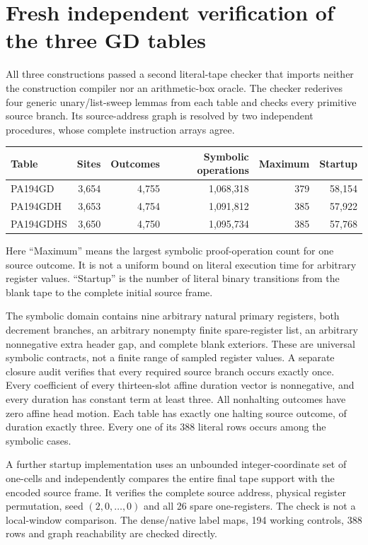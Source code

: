 \section{Fresh independent verification of the three GD tables}

All three constructions passed a second literal-tape checker that imports
neither the construction compiler nor an arithmetic-box oracle. The checker
rederives four generic unary/list-sweep lemmas from each table and checks
every primitive source branch. Its source-address graph is resolved by
two independent procedures, whose complete instruction arrays agree.

\begin{center}
\begin{tabular}{lrrrrr}
\toprule
Table & Sites & Outcomes & Symbolic operations & Maximum & Startup\\
\midrule
PA194GD & 3,654 & 4,755 & 1,068,318 & 379 & 58,154\\
PA194GDH & 3,653 & 4,754 & 1,091,812 & 385 & 57,922\\
PA194GDHS & 3,650 & 4,750 & 1,095,734 & 385 & 57,768\\
\bottomrule
\end{tabular}
\end{center}

Here ``Maximum'' means the largest symbolic proof-operation count for one
source outcome. It is not a uniform bound on literal execution time for
arbitrary register values. ``Startup'' is the number of literal binary
transitions from the blank tape to the complete initial source frame.

The symbolic domain contains nine arbitrary natural primary registers,
both decrement branches, an arbitrary nonempty finite spare-register list,
an arbitrary nonnegative extra header gap, and complete blank exteriors.
These are universal symbolic contracts, not a finite range of sampled
register values. A separate closure audit verifies that every required
source branch occurs exactly once. Every coefficient of every thirteen-slot
affine duration vector is nonnegative, and every duration has constant term
at least three. All nonhalting outcomes have zero affine head motion. Each
table has exactly one halting source outcome, of duration exactly three.
Every one of its 388 literal rows occurs among the symbolic cases.

A further startup implementation uses an unbounded integer-coordinate set
of one-cells and independently compares the entire final tape support with
the encoded source frame. It verifies the complete source address, physical
register permutation, seed $(2,0,\ldots,0)$ and all 26 spare one-registers.
The check is not a local-window comparison. The dense/native label maps,
194 working controls, 388 rows and graph reachability are checked directly.

